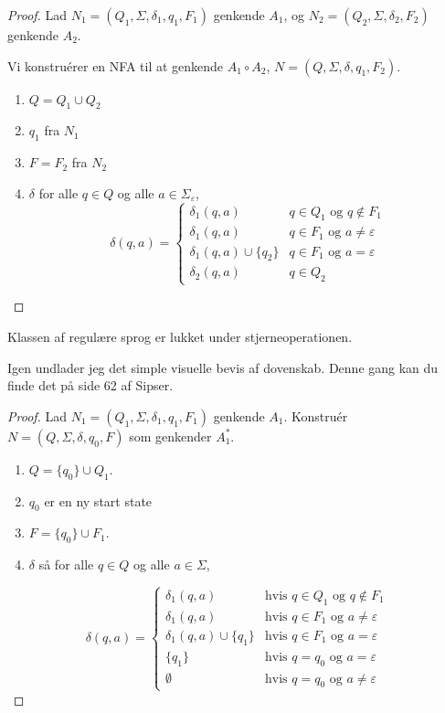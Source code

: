 \begin{proof}
  Lad $N_{1} =(Q_{1}, \Sigma, \delta_{1}, q_{1}, F_{1})$ genkende $A_{1}$, og $N_{2} = (Q_{2}, \Sigma, \delta_{2}, F_{2})$ genkende $A_{2}$.

  Vi konstruérer en NFA til at genkende $A_{1} \circ A_{2}$, $N = (Q, \Sigma, \delta, q_{1}, F_{2})$.
  \begin{enumerate}
    \item $Q = Q_{1} \cup Q_{2}$
    \item $q_{1}$ fra $N_{1}$
    \item $F = F_{2}$ fra $N_{2}$
    \item $\delta$ for alle $q \in Q$ og alle $a \in \Sigma_{\varepsilon}$,
          \begin{equation*}
\delta(q,a) = \begin{cases}
           \delta_{1}(q,a)& q \in Q_{1} \text{ og } q \notin F_{1}\\
           \delta_{1}(q,a)& q \in F_{1} \text{ og } a \neq \varepsilon \\

           \delta_{1}(q,a) \cup \{q_{2}\}& q \in F_{1} \text{ og } a = \varepsilon \\
           \delta_{2}(q,a) & q \in Q_{2}
         \end{cases}
          \end{equation*}
  \end{enumerate}
\end{proof}

\begin{theorem}
Klassen af regulære sprog er lukket under stjerneoperationen.
\end{theorem}

Igen undlader jeg det simple visuelle bevis af dovenskab. Denne gang kan du finde det på side 62 af Sipser.

\begin{proof}
Lad $N_1 = (Q_1, \Sigma, \delta_1, q_1, F_1)$ genkende $A_1$.
Konstruér $N = (Q, \Sigma, \delta, q_0, F)$ som genkender $A_1^*$.

\begin{enumerate}
    \item $Q = \{q_0\} \cup Q_1$.
    \item $q_{0}$ er en ny start state
    \item $F = \{q_0\} \cup F_1$.
  \item  $\delta$ så for alle $q \in Q$ og alle $a \in \Sigma$,
\end{enumerate}
\[
\delta(q, a) = \begin{cases}
\delta_1(q, a) & \text{hvis } q \in Q_1 \text{ og } q \notin F_1 \\
\delta_1(q, a) & \text{hvis } q \in F_1 \text{ og } a \neq \varepsilon \\
\delta_1(q, a) \cup \{q_1\} & \text{hvis } q \in F_1 \text{ og } a = \varepsilon \\
\{q_1\} & \text{hvis } q = q_0 \text{ og } a = \varepsilon \\
\emptyset & \text{hvis } q = q_0 \text{ og } a \neq \varepsilon
\end{cases}
\]
\end{proof}

